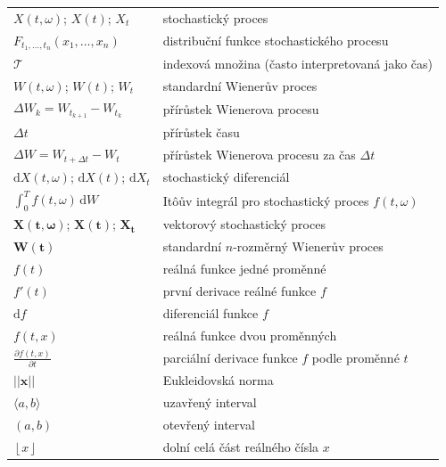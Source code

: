 \documentclass[a4paper,12pt]{report}
\theoremstyle{definition} \newtheorem{definice}[veta]{Definice}
\theoremstyle{remark}
\begin{document}
   \begin{tabular}{p{4cm} p{9.3cm}}
     $X(t,\omega)$; $X(t)$; $X_t$                       &   stochastický proces \\
   $F_{t_1,\dots,t_n}(x_1,\dots,x_n)$                       &  distribuční funkce stochastického procesu \\
   $\mathcal{T}$					& indexová množina (často interpretovaná jako čas)\\
   $W(t,\omega)$; $W(t)$; $W_t$                       &   standardní Wienerův proces \\
   $\Delta W_k=W_{t_{k+1}}-W_{t_k}$				 &   přírůstek Wienerova procesu \\
   $\Delta t$						& přírůstek času \\
   $\Delta W=W_{t+\Delta t}-W_{t}$				 &   přírůstek Wienerova procesu za čas $\Delta t$\\
   $\mathrm{d}X(t,\omega)$; $\mathrm{d}X(t)$; $\mathrm{d}X_t$    &  stochastický diferenciál \\ %
   $\int_0^Tf(t,\omega)\,\mathrm{d}W$                              &   It\^oův integrál pro stochastický proces $f(t,\omega)$ \\
   $\boldsymbol{X}(\boldsymbol{t},\boldsymbol{\omega})$; $\boldsymbol{X}(\boldsymbol{t})$; $\boldsymbol{X}_{\boldsymbol{t}}$  		& vektorový stochastický proces\\
   $\boldsymbol{W}(\boldsymbol{t})$ 		& standardní $n$-rozměrný Wienerův proces\\
   $f(t)$				& reálná funkce jedné proměnné\\
   $f'(t)$				& první derivace reálné funkce $f$\\
   $\mathrm{d}f$				& diferenciál funkce $f$\\
   $f(t,x)$				& reálná funkce dvou proměnných\\
   $\frac{\partial f(t,x)}{\partial t}$				& parciální derivace funkce $f$ podle proměnné $t$\\
   $||\boldsymbol x||$				& Eukleidovská norma\\
   $\langle a,b\rangle$				& uzavřený interval\\
   $\left(a,b\right)$				          & otevřený interval\\
   $\left\lfloor x\right\rfloor$			&dolní celá část reálného čísla $x$
   \end{tabular}\\\\\\
\end{document}
